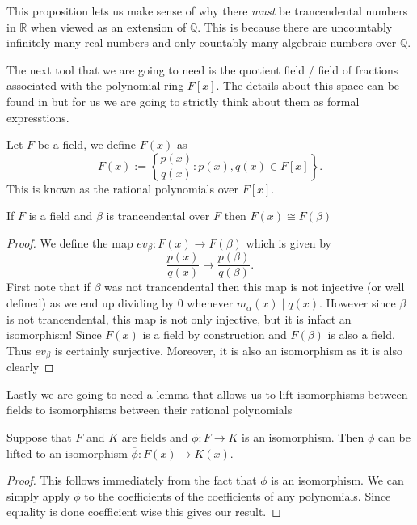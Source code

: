 This proposition lets us make sense of why there \textit{must} be trancendental
numbers in $\mathbb{R}$ when viewed as an extension of $\mathbb{Q}$. This is
because there are uncountably infinitely many real numbers and only countably
many algebraic numbers over $\mathbb{Q}$. 

The next tool that we are going to need is the quotient field / field of
fractions associated with the polynomial ring $F[x]$. The details about this
space can be found in \cite{Dummit_Foote_2004} but for us we are going to
strictly think about them as formal expresstions.

\begin{defn}
  Let $F$ be a field, we define $F(x)$ as
  \[
    F(x) := \left\{\frac{p(x)}{q(x)}: p(x), q(x) \in F[x]\right\} 
  .\] 
  This is known as the rational polynomials over $F[x]$.
\end{defn}

\begin{lemma}\label{lemma:isotoquot}
  If $F$ is a field and $\beta$ is trancendental over $F$ then $F(x) \cong
  F(\beta)$ 
\end{lemma}
\begin{proof}
  We define the map $ev_{\beta}: F(x) \to F(\beta)$ which is given by 
\[
  \frac{p(x)}{q(x)} \mapsto \frac{p(\beta)}{q(\beta)}
  .\] 
  First note that if $\beta$ was not trancendental then this map is not injective
  (or well defined) as we end up dividing by 0 whenever $m_{\alpha}(x) \mid
  q(x)$. However since $\beta$ is not trancendental, this map is not only
  injective, but it is infact an isomorphism! Since $F(x)$ is a field by
  construction and $F(\beta)$ is also a field. Thus $ev_{\beta}$ is certainly
  surjective. Moreover, it is also an isomorphism as it is also clearly
\end{proof}

Lastly we are going to need a lemma that allows us to lift isomorphisms between
fields to isomorphisms between their rational polynomials

\begin{lemma}\label{lemma:lifttoquot}
 Suppose that $F$ and $K$ are fields and $\phi: F \to K$ is an isomorphism.
 Then $\phi$ can be lifted to an isomorphism $\overline{\phi}: F(x) \to K(x)$. 
\end{lemma}
\begin{proof}
  This follows immediately from the fact that $\phi$ is an isomorphism. We can
  simply apply $\phi$ to the coefficients of the coefficients of any
  polynomials. Since equality is done coefficient wise this gives our result.
\end{proof}

